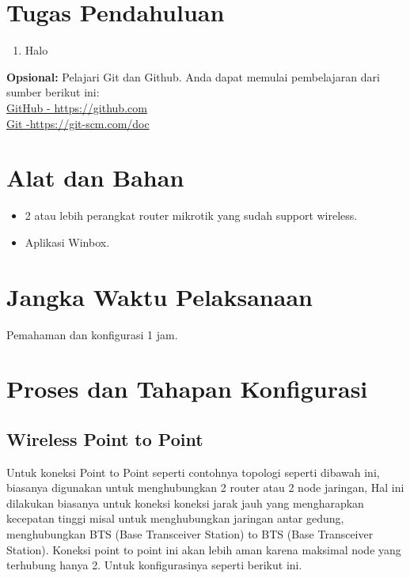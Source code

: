 \section{Tugas Pendahuluan}
\begin{enumerate}
	\item Halo
\end{enumerate}

\begin{center}
	\colorbox{cyan!30}{\parbox{0.8\linewidth}{\textbf{Opsional:} Pelajari Git dan Github. Anda dapat memulai pembelajaran dari sumber berikut ini: \\ \href{https://github.com}{GitHub - https://github.com} \\ \href{https://git-scm.com/doc}{Git -https://git-scm.com/doc}}}
\end{center}

\section{Alat dan Bahan}
\begin{itemize}[label=$\bullet$, itemsep=-1pt, leftmargin=*]
	\item 2 atau lebih perangkat router mikrotik yang sudah support wireless.
	\item Aplikasi Winbox.
\end{itemize}

\section{Jangka Waktu Pelaksanaan}
Pemahaman dan konfigurasi 1 jam.

\section{Proses dan Tahapan Konfigurasi}

\subsection{Wireless Point to Point}
Untuk koneksi Point to Point seperti contohnya topologi seperti dibawah ini, biasanya
digunakan untuk menghubungkan 2 router atau 2 node jaringan, Hal ini dilakukan biasanya
untuk koneksi koneksi jarak jauh yang mengharapkan kecepatan tinggi misal untuk
menghubungkan jaringan antar gedung, menghubungkan BTS (Base Transceiver Station) to
BTS (Base Transceiver Station). Koneksi point to point ini akan lebih aman karena maksimal
node yang terhubung hanya 2. Untuk konfigurasinya seperti berikut ini.

